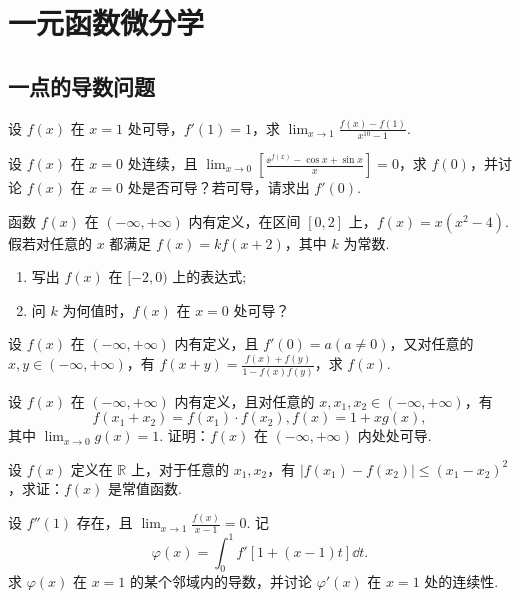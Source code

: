 \section{一元函数微分学}
	\subsection{一点的导数问题}

	\begin{ti}
		设 $f(x)$ 在 $x = 1$ 处可导，$f'(1) = 1$，求 $\lim_{x \to 1} \frac{f(x) - f(1)}{x^{10} - 1}$.
	\end{ti}

	\begin{ti}
		设 $f(x)$ 在 $x = 0$ 处连续，且 $\lim_{x \to 0} \left[ \frac{\ee^{f(x)} - \cos x + \sin x}{x} \right] = 0$，求 $f(0)$，并讨论 $f(x)$ 在 $x = 0$ 处是否可导？若可导，请求出 $f'(0)$.
	\end{ti}

	\begin{ti}
		函数 $f(x)$ 在 $(-\infty,+\infty)$ 内有定义，在区间 $[0,2]$ 上，$f(x) = x\left( x^{2} - 4 \right)$. 假若对任意的 $x$ 都满足 $f(x) = k f(x + 2)$，其中 $k$ 为常数.
		\begin{enumerate}
			\item 写出 $f(x)$ 在 $[-2,0)$ 上的表达式;
			\item 问 $k$ 为何值时，$f(x)$ 在 $x = 0$ 处可导？
		\end{enumerate}
	\end{ti}

	\begin{ti}
		设 $f(x)$ 在 $(-\infty,+\infty)$ 内有定义，且 $f'(0) = a(a \ne 0)$，又对任意的 $x,y \in (-\infty,+\infty)$，有 $f(x + y) = \frac{f(x) + f(y)}{1 - f(x)f(y)}$，求 $f(x)$.
	\end{ti}
	
	\begin{ti}
		设 $f(x)$ 在 $(-\infty,+\infty)$ 内有定义，且对任意的 $x,x_{1},x_{2} \in (-\infty,+\infty)$，有
		\[
			f(x_{1} + x_{2}) = f(x_{1}) \cdot f(x_{2}),f(x) = 1 + xg(x),
		\]
		其中 $\lim_{x \to 0} g(x) = 1$. 证明：$f(x)$ 在 $(-\infty,+\infty)$ 内处处可导.
	\end{ti}

	\begin{ti}
		设 $f(x)$ 定义在 $\mathbb{R}$ 上，对于任意的 $x_{1},x_{2}$，有 $|f(x_{1}) - f(x_{2})| \leq (x_{1} - x_{2})^{2}$，求证：$f(x)$ 是常值函数.
	\end{ti}

	\begin{ti}
		设 $f''(1)$ 存在，且 $\lim_{x \to 1}\frac{f(x)}{x - 1} = 0$. 记
		\[
			\varphi(x) = \int_{0}^{1} f'[1 + (x - 1)t]\dd{t}.
		\]
		求 $\varphi(x)$ 在 $x = 1$ 的某个邻域内的导数，并讨论 $\varphi'(x)$ 在 $x = 1$ 处的连续性.
	\end{ti}

